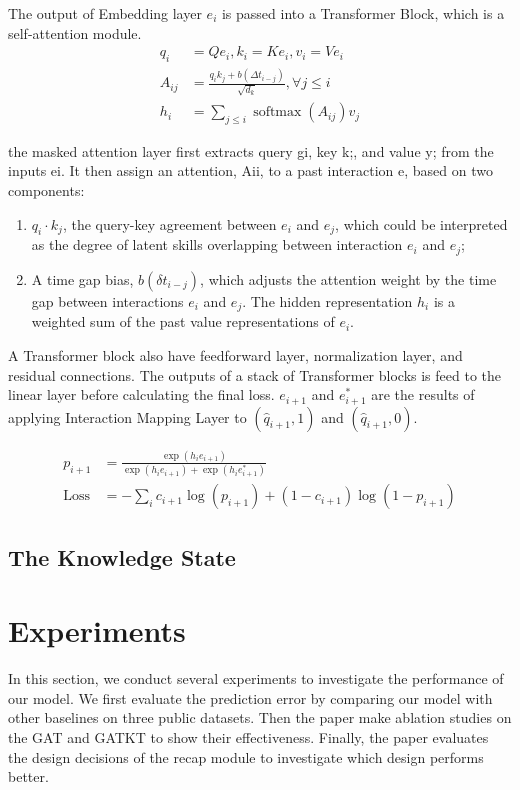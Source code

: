 The output of Embedding layer \(e_i\) is passed into a Transformer Block, which is a self-attention module.
\begin{align}
	q_{i}   & =Q e_{i}, k_{i}=K e_{i}, v_{i}=V e_{i}                                \\
	A_{i j} & =\frac{q_{i} k_{j}+b(\Delta t_{i-j})}{\sqrt{d_{k}}}, \forall j \leq i \\
	h_{i}   & =\sum_{j \leq i} \operatorname{softmax}(A_{i j}) v_{j}
\end{align}

the masked attention layer first extracts query gi, key k;, and value y; from the inputs ei. It then assign an attention, Aii, to a past interaction e, based on two components:
\begin{enumerate}
	\item \(q_i\cdot k_j\), the query-key agreement between \(e_i\) and \(e_j\), which could be interpreted as the degree of latent skills overlapping between interaction \(e_i\) and \(e_j\);
	\item A time gap bias, \(b(\delta t_{i-j})\), which adjusts the attention weight by the time gap between interactions \(e_i\) and \(e_j\). The hidden representation \(h_i\) is a weighted sum of the past value representations of \(e_i\).
\end{enumerate}

A Transformer block also have feedforward layer, normalization layer, and residual connections. The outputs of a stack of Transformer blocks is feed to the linear layer before calculating the final loss. \(e_{i+1}\) and \(e_{i+1}^*\) are the results of applying Interaction Mapping Layer to \((\hat{q}_{i+1}, 1)\) and \((\hat{q}_{i+1}, 0)\).

\begin{align}
	p_{i+1}     & =\frac{\exp (h_{i} e_{i+1})}{\exp (h_{i} e_{i+1})+\exp (h_{i} e_{i+1}^{*})} \\
	\text{Loss} & =-\sum_{i} c_{i+1} \log (p_{i+1})+(1-c_{i+1}) \log (1-p_{i+1})
\end{align}


\subsection{The Knowledge State }


\section{Experiments}
In this section, we conduct several experiments to investigate the performance of our model. We first evaluate the prediction error by comparing our model with other baselines on three public datasets. Then the paper make ablation studies on the GAT and GATKT to show their effectiveness. Finally, the paper evaluates the design decisions of the recap module to investigate which design performs better.
